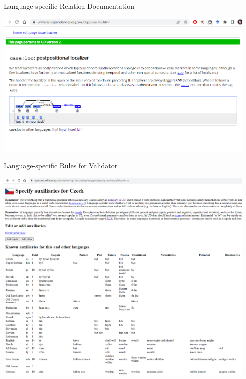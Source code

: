 \documentclass[10pt, compress, aspectratio=169]{beamer}
\begin{document}
\begin{frame}{Language-specific Relation Documentation}
  \begin{center}
    \includegraphics[width=0.95\textwidth]{images/docs-yue-case-loc.png}
  \end{center}
\end{frame}


\begin{frame}{Language-specific Rules for Validator}
  \begin{center}
    \includegraphics[width=0.95\textwidth]{images/validator-specify-auxiliaries-cs.png}
  \end{center}
\end{frame}
\end{document}
